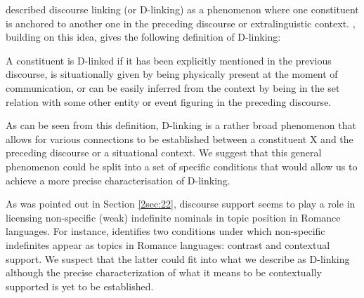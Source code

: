 \documentclass[output=paper]{langsci/langscibook}
\begin{document}
\cite{pesetsky:87} described discourse linking (or D-linking) as a phenomenon where one constituent is anchored to another one in the preceding discourse or extralinguistic context. \cite[][73]{dyakonova:09}, building on this idea, gives the following definition of D-linking:

\begin{exe}
\ex\label{2ex:20}
{
A constituent is D-linked if it has been explicitly mentioned in the previous discourse, is situationally given by being physically present at the moment of communication, or can be easily inferred from the context by being in the set relation with some other entity or event figuring in the preceding discourse.
}
\end{exe}

{
As can be seen from this definition, D-linking is a rather broad phenomenon that allows for various connections to be established between a constituent X and the preceding discourse or a situational context. We suggest that this general phenomenon could be split into a set of specific conditions that would allow us to achieve a more precise characterisation of D-linking.
}

As was pointed out in Section \ref{2sec:22}, discourse support seems to play a role in licensing non-specific (weak) indefinite nominals in topic position in Romance languages. For instance, \cite{leonetti:10} identifies two conditions under which non-specific indefinites appear as topics in Romance languages: contrast and contextual support. We suspect that the latter could fit into what we describe as D-linking although the precise characterization of what it means to be contextually supported is yet to be established.
\end{document}
